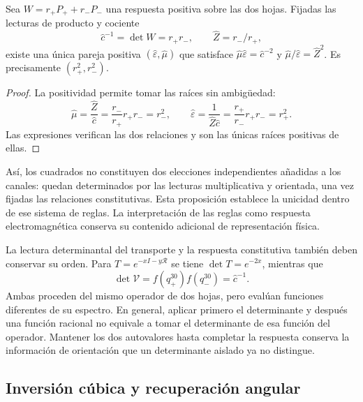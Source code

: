 \begin{proposition}
Sea $W=r_+P_++r_-P_-$ una respuesta positiva sobre las dos hojas.
Fijadas las lecturas de producto y cociente
\[
 \widehat c^{-1}=\det W=r_+r_-,
 \qquad \widehat Z=r_-/r_+,
\]
existe una única pareja positiva $(\widehat\varepsilon,\widehat\mu)$
que satisface
$\widehat\mu\widehat\varepsilon=\widehat c^{-2}$ y
$\widehat\mu/\widehat\varepsilon=\widehat Z^2$.
Es precisamente $(r_+^2,r_-^2)$.
\end{proposition}
\begin{proof}
La positividad permite tomar las raíces sin ambigüedad:
\[
 \widehat\mu=\frac{\widehat Z}{\widehat c}
 =\frac{r_-}{r_+}r_+r_-=r_-^2,\qquad
 \widehat\varepsilon=\frac1{\widehat Z\widehat c}
 =\frac{r_+}{r_-}r_+r_-=r_+^2.
\]
Las expresiones verifican las dos relaciones y son las únicas raíces
positivas de ellas.
\end{proof}

Así, los cuadrados no constituyen dos elecciones independientes añadidas
a los canales: quedan determinados por las lecturas multiplicativa y
orientada, una vez fijadas las relaciones constitutivas. Esta proposición
establece la unicidad dentro de ese sistema de reglas. La interpretación
de las reglas como respuesta electromagnética conserva su contenido
adicional de representación física.

La lectura determinantal del transporte y la respuesta constitutiva
también deben conservar su orden. Para $T=e^{-xI-y\mathcal R}$ se tiene
$\det T=e^{-2x}$, mientras que
\[
 \det\mathcal V=f(q_+^{30})f(q_-^{30})=\widehat c^{-1}.
\]
Ambas proceden del mismo operador de dos hojas, pero evalúan funciones
diferentes de su espectro. En general, aplicar primero el determinante
y después una función racional no equivale a tomar el determinante de
esa función del operador. Mantener los dos autovalores hasta completar
la respuesta conserva la información de orientación que un determinante
aislado ya no distingue.

\subsection{Inversión cúbica y recuperación angular}

